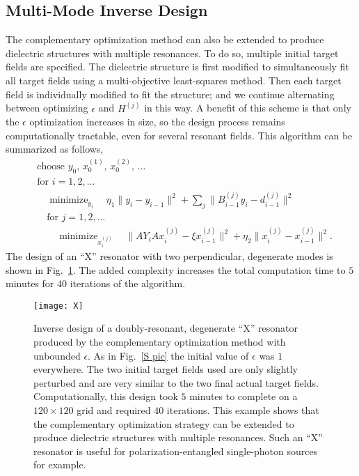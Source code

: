 \documentclass[10pt,letterpaper]{article}
\DeclareMathOperator*{\minimize}{minimize}
\begin{document}
\subsection{Multi-Mode Inverse Design}
The complementary optimization method can also be extended to produce dielectric structures with multiple resonances. To do so, multiple initial target fields are specified. The dielectric structure is first modified to simultaneously fit all target fields using a multi-objective least-squares method. Then each target field is individually modified to fit the structure; and we continue alternating between optimizing $\epsilon$ and $H^{(j)}$ in this way. A benefit of this scheme is that only the $\epsilon$ optimization increases in size, so the design process remains computationally tractable, even for several resonant fields. This algorithm can be summarized as follows,
\begin{align}
&\text{choose $y_0$, $x^{(1)}_0$, $x^{(2)}_0$, \ldots} \nonumber \\
&\text{for } i = 1, 2, \ldots \nonumber \\
&\quad\minimize_{y_i}\quad \eta_1\|y_i-y_{i-1}\|^2 + \sum_j \|B^{(j)}_{i-1} y_i-d^{(j)}_{i-1}\|^2  \label{mm1}\\
&\quad\text{for } j = 1, 2, \ldots \nonumber \\
&\quad\quad\minimize_{x^{(j)}_i}\quad \|A Y_i A x^{(j)}_i - \xi x^{(j)}_{i-1}\|^2 + \eta_2\|x^{(j)}_i-x^{(j)}_{i-1}\|^2. \label{mm2}
\end{align}
The design of an ``X'' resonator with two perpendicular, degenerate modes is shown in Fig.~\ref{X pic}. The added complexity increases the total computation time to $5$ minutes for $40$ iterations of the algorithm. 
\begin{figure}\centering
\texttt{[image: X]}
\caption{Inverse design of a doubly-resonant, degenerate ``X'' resonator produced by the complementary optimization method with unbounded $\epsilon$. As in Fig.~\ref{S pic} the initial value of $\epsilon$ was $1$ everywhere. The two initial target fields used are only slightly perturbed and are very similar to the two final actual target fields. Computationally, this design took $5$ minutes to complete on a $120\times 120$ grid and required $40$ iterations. This example shows that the complementary optimization strategy can be extended to produce dielectric structures with multiple resonances. Such an ``X'' resonator is useful for polarization-entangled single-photon sources for example\cite{Hen06}.}
\label{X pic}
\end{figure}
\end{document}
